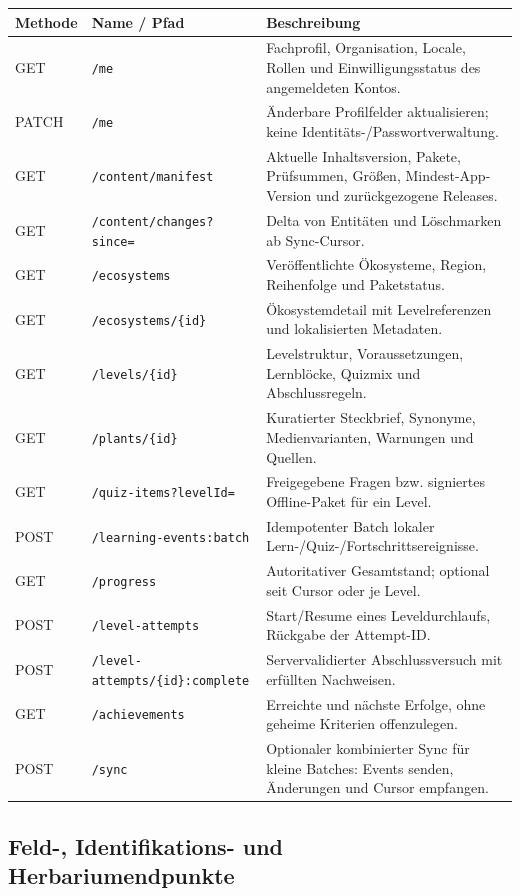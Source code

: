 \documentclass[10pt,a4paper,oneside]{article}
\newcommand{\Code}[1]{\texttt{\small #1}}
\begin{document}
\small
\begin{longtable}{@{}p{14mm}p{54mm}p{92mm}@{}}
\toprule
\textbf{Methode} & \textbf{Name / Pfad} & \textbf{Beschreibung} \\
\midrule
\endhead
GET & \Code{/me} & Fachprofil, Organisation, Locale, Rollen und Einwilligungsstatus des angemeldeten Kontos. \\
PATCH & \Code{/me} & Änderbare Profilfelder aktualisieren; keine Identitäts-/Passwortverwaltung. \\
GET & \Code{/content/manifest} & Aktuelle Inhaltsversion, Pakete, Prüfsummen, Größen, Mindest-App-Version und zurückgezogene Releases. \\
GET & \Code{/content/changes?since=} & Delta von Entitäten und Löschmarken ab Sync-Cursor. \\
GET & \Code{/ecosystems} & Veröffentlichte Ökosysteme, Region, Reihenfolge und Paketstatus. \\
GET & \Code{/ecosystems/\{id\}} & Ökosystemdetail mit Levelreferenzen und lokalisierten Metadaten. \\
GET & \Code{/levels/\{id\}} & Levelstruktur, Voraussetzungen, Lernblöcke, Quizmix und Abschlussregeln. \\
GET & \Code{/plants/\{id\}} & Kuratierter Steckbrief, Synonyme, Medienvarianten, Warnungen und Quellen. \\
GET & \Code{/quiz-items?levelId=} & Freigegebene Fragen bzw. signiertes Offline-Paket für ein Level. \\
POST & \Code{/learning-events:batch} & Idempotenter Batch lokaler Lern-/Quiz-/Fortschrittsereignisse. \\
GET & \Code{/progress} & Autoritativer Gesamtstand; optional seit Cursor oder je Level. \\
POST & \Code{/level-attempts} & Start/Resume eines Leveldurchlaufs, Rückgabe der Attempt-ID. \\
POST & \Code{/level-attempts/\{id\}:complete} & Servervalidierter Abschlussversuch mit erfüllten Nachweisen. \\
GET & \Code{/achievements} & Erreichte und nächste Erfolge, ohne geheime Kriterien offenzulegen. \\
POST & \Code{/sync} & Optionaler kombinierter Sync für kleine Batches: Events senden, Änderungen und Cursor empfangen. \\
\bottomrule
\end{longtable}

\subsection{Feld-, Identifikations- und Herbariumendpunkte}
\end{document}
